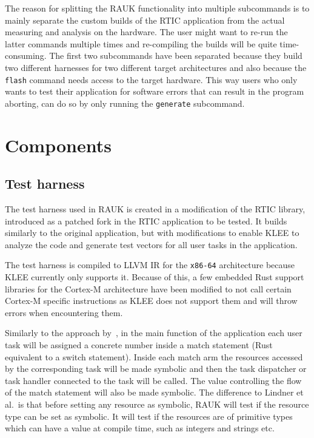 The reason for splitting the RAUK functionality into multiple subcommands is to
mainly separate the custom builds of the RTIC application from the actual
measuring and analysis on the hardware. The user might want to re-run the latter
commands multiple times and re-compiling the builds will be quite
time-consuming. The first two subcommands have been separated because they
build two different harnesses for two different target architectures and also
because the \texttt{flash} command needs access to the target hardware. This
way users who only wants to test their application for software errors that can 
result in the program aborting, can do so by only running the \texttt{generate}
subcommand.

\section{Components}

\subsection{Test harness}
The test harness used in RAUK is created in a modification of the RTIC library,
introduced as a patched fork in the RTIC application to be tested. It builds
similarly to the original application, but with modifications to enable KLEE to
analyze the code and generate test vectors for all user tasks in the
application.

The test harness is compiled to LLVM IR for the \texttt{x86-64} architecture
because KLEE currently only supports it. Because of this, a few embedded Rust support
libraries for the Cortex-M architecture have been modified to not call certain
Cortex-M specific instructions as KLEE does not support them and will throw
errors when encountering them.

Similarly to the approach by~\cite{lindner}, in the main function of the
application each user task will be assigned a concrete number inside a match
statement (Rust equivalent to a switch statement). Inside each match arm the
resources accessed by the corresponding task will be made symbolic and then
the task dispatcher or task handler connected to the task will be called. The
value controlling the flow of the match statement will also be made symbolic.
The difference to Lindner et al.\ is that before setting any resource as
symbolic, RAUK will test if the resource type can be set as symbolic. It
will test if the resources are of primitive types which can have a value at
compile time, such as integers and strings etc.

